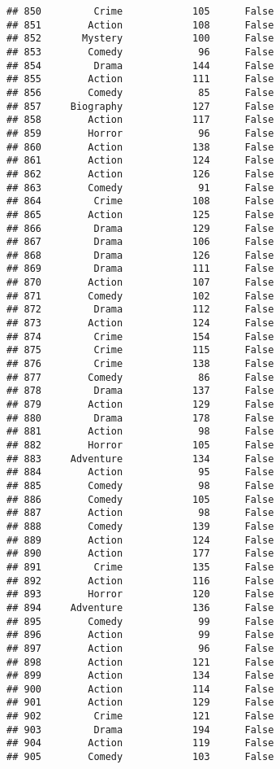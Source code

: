 \documentclass[
]{article}
\begin{document}
\begin{verbatim}
## 850         Crime            105      False
## 851        Action            108      False
## 852       Mystery            100      False
## 853        Comedy             96      False
## 854         Drama            144      False
## 855        Action            111      False
## 856        Comedy             85      False
## 857     Biography            127      False
## 858        Action            117      False
## 859        Horror             96      False
## 860        Action            138      False
## 861        Action            124      False
## 862        Action            126      False
## 863        Comedy             91      False
## 864         Crime            108      False
## 865        Action            125      False
## 866         Drama            129      False
## 867         Drama            106      False
## 868         Drama            126      False
## 869         Drama            111      False
## 870        Action            107      False
## 871        Comedy            102      False
## 872         Drama            112      False
## 873        Action            124      False
## 874         Crime            154      False
## 875         Crime            115      False
## 876         Crime            138      False
## 877        Comedy             86      False
## 878         Drama            137      False
## 879        Action            129      False
## 880         Drama            178      False
## 881        Action             98      False
## 882        Horror            105      False
## 883     Adventure            134      False
## 884        Action             95      False
## 885        Comedy             98      False
## 886        Comedy            105      False
## 887        Action             98      False
## 888        Comedy            139      False
## 889        Action            124      False
## 890        Action            177      False
## 891         Crime            135      False
## 892        Action            116      False
## 893        Horror            120      False
## 894     Adventure            136      False
## 895        Comedy             99      False
## 896        Action             99      False
## 897        Action             96      False
## 898        Action            121      False
## 899        Action            134      False
## 900        Action            114      False
## 901        Action            129      False
## 902         Crime            121      False
## 903         Drama            194      False
## 904        Action            119      False
## 905        Comedy            103      False

\end{verbatim}
\end{document}
